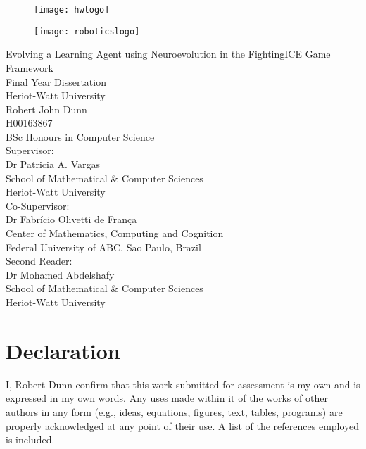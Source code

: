 \documentclass[12pt,a4paper]{article}
\begin{document}
\thispagestyle{empty}
\begin{figure}
\centering
\begin{minipage}{.5\textwidth}
  \centering
  \texttt{[image: hwlogo]}
  \label{fig:test1}
\end{minipage}%
\begin{minipage}{.5\textwidth}
  \centering
  \texttt{[image: roboticslogo]}
  \label{fig:test2}
\end{minipage}
\end{figure}
{
\centering
\vspace{10mm}
{\huge Evolving a Learning Agent using Neuroevolution in the FightingICE Game Framework}\\
\vspace{20mm}
{\large Final Year Dissertation}\\
{\large Heriot-Watt University}\\
\vspace{10mm}
{\large Robert John Dunn\\
H00163867\\
BSc Honours in Computer Science\\
}
\vspace{10mm}
{\large Supervisor:}\\
Dr Patricia A. Vargas\\
School of Mathematical \& Computer Sciences\\
Heriot-Watt University
\vspace{3mm}\\
{\large Co-Supervisor:}\\
Dr Fabrício Olivetti de França\\
Center of Mathematics, Computing and Cognition\\
Federal University of ABC, Sao Paulo, Brazil
\vspace{3mm}\\
{\large Second Reader:}\\
Dr Mohamed Abdelshafy\\
School of Mathematical \& Computer Sciences\\
Heriot-Watt University\\}
\newpage
\thispagestyle{empty}
\vspace*{30mm}
\section*{Declaration}
I,  Robert Dunn confirm that this work submitted for assessment is my own and is expressed
in my own words. Any uses made within it of the works of other authors in any
form (e.g., ideas, equations, figures, text, tables, programs) are properly acknowledged
at any point of their use. A list of the references employed is included.\\
\end{document}
